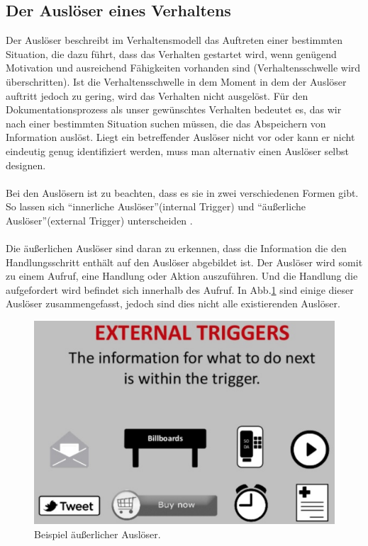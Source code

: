 \documentclass[a4paper,12pt]{scrartcl}
\begin{document}
\subsection{Der Auslöser eines Verhaltens}
Der Auslöser beschreibt im Verhaltensmodell das Auftreten einer bestimmten Situation, die dazu führt, dass das Verhalten gestartet wird, wenn genügend Motivation und ausreichend Fähigkeiten vorhanden sind (Verhaltensschwelle wird überschritten). Ist die Verhaltensschwelle in dem Moment in dem der Auslöser auftritt jedoch zu gering, wird das Verhalten nicht ausgelöst. Für den Dokumentationsprozess als unser gewünschtes Verhalten bedeutet es, das wir nach einer bestimmten Situation suchen müssen, die das Abspeichern von Information auslöst. Liegt ein betreffender Auslöser nicht vor oder kann er nicht eindeutig genug identifiziert werden, muss man alternativ einen Auslöser selbst designen.
\\\\
Bei den Auslösern ist zu beachten, dass es sie in zwei verschiedenen Formen gibt. So lassen sich \enquote{innerliche Auslöser}(internal Trigger) und \enquote{äußerliche Auslöser}(external Trigger) unterscheiden \cite{Eyal2014}.
\\\\
Die äußerlichen Auslöser sind daran zu erkennen, dass die Information die den Handlungsschritt enthält auf den Auslöser abgebildet ist. Der Auslöser wird somit zu einem Aufruf, eine Handlung oder Aktion auszuführen. Und die Handlung die aufgefordert wird befindet sich innerhalb des Aufruf. In Abb.\ref{externaltriggerBild} sind einige dieser Auslöser zusammengefasst, jedoch sind dies nicht alle existierenden Auslöser.
\begin{figure}[h!]
\begin{center}
\includegraphics[scale = 0.4]{Bilder/externalTrigger.eps}
\caption{Beispiel äußerlicher Auslöser\cite{ExternalTrigger2018}.}
\label{externaltriggerBild}
\end{center}
\end{figure}
\end{document}
